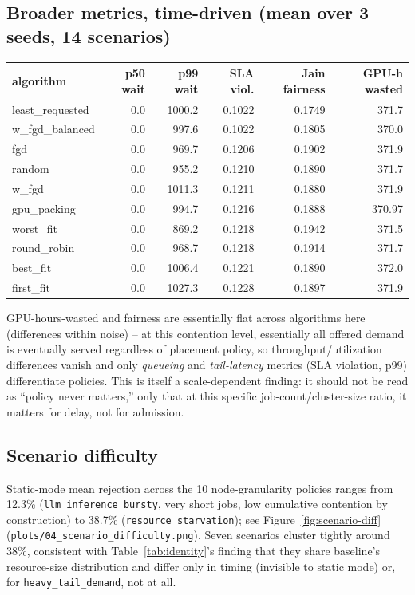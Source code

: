 \documentclass[11pt]{article}
\begin{document}
\subsection{Broader metrics, time-driven (mean over 3 seeds, 14 scenarios)}
\begin{table}[h]
\centering
\small
\begin{tabular}{lrrrrr}
\toprule
algorithm & p50 wait & p99 wait & SLA viol. & Jain fairness & GPU-h wasted \\
\midrule
least\_requested & 0.0 & 1000.2 & 0.1022 & 0.1749 & 371.7 \\
w\_fgd\_balanced  & 0.0 & 997.6  & 0.1022 & 0.1805 & 370.0 \\
fgd               & 0.0 & 969.7  & 0.1206 & 0.1902 & 371.9 \\
random            & 0.0 & 955.2  & 0.1210 & 0.1890 & 371.7 \\
w\_fgd            & 0.0 & 1011.3 & 0.1211 & 0.1880 & 371.9 \\
gpu\_packing      & 0.0 & 994.7  & 0.1216 & 0.1888 & 370.97 \\
worst\_fit        & 0.0 & 869.2  & 0.1218 & 0.1942 & 371.5 \\
round\_robin      & 0.0 & 968.7  & 0.1218 & 0.1914 & 371.7 \\
best\_fit         & 0.0 & 1006.4 & 0.1221 & 0.1890 & 372.0 \\
first\_fit        & 0.0 & 1027.3 & 0.1228 & 0.1897 & 371.9 \\
\bottomrule
\end{tabular}
\end{table}
GPU-hours-wasted and fairness are essentially flat across algorithms here
(differences within noise) -- at this contention level, essentially all
offered demand is eventually served regardless of placement policy, so
throughput/utilization differences vanish and only \emph{queueing} and
\emph{tail-latency} metrics (SLA violation, p99) differentiate policies.
This is itself a scale-dependent finding: it should not be read as ``policy
never matters,'' only that at this specific job-count/cluster-size ratio,
it matters for delay, not for admission.

\subsection{Scenario difficulty}
Static-mode mean rejection across the 10 node-granularity policies ranges
from 12.3\% (\texttt{llm\_inference\_bursty}, very short jobs, low
cumulative contention by construction) to 38.7\% (\texttt{resource\_starvation});
see Figure~\ref{fig:scenario-diff} (\texttt{plots/04\_scenario\_difficulty.png}).
Seven scenarios cluster tightly around 38\%, consistent with
Table~\ref{tab:identity}'s finding that they share baseline's resource-size
distribution and differ only in timing (invisible to static mode) or, for
\texttt{heavy\_tail\_demand}, not at all.
\end{document}
